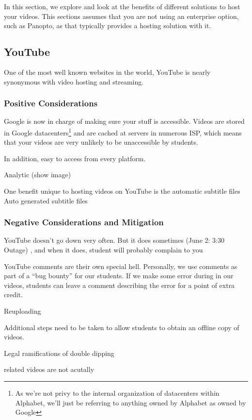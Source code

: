 \documentclass[sigconf]{acmart}
\begin{document}
In this section, we explore and look at the benefits of different solutions to host your videos.  
This sections assumes that you are not using an enterprise option, such as Panopto, as that typically provides a hosting solution with it.

\subsection{YouTube}
One of the most well known websites in the world, YouTube is nearly synonymous with video hosting and streaming.


\subsubsection{Positive Considerations}
Google is now in charge of making sure your stuff is accessible.
Videos are stored in Google datacenters\footnote{As we're not privy to the internal organization of datacenters within Alphabet, we'll just be referring to anything owned by Alphabet as owned by Google} and are cached at servers in numerous ISP, which means that your videos are very unlikely to be unaccessible by students. 

In addition, easy to access from every platform.

Analytic  (show image)


One benefit unique to hosting videos on YouTube is the automatic subtitle files \cite{liao2013large}
Auto generated subtitle files


\subsubsection{Negative Considerations and Mitigation}
YouTube doesn't go down very often.  
But it does sometimes \cite{outage2018} (June 2: 3:30 Outage) \cite{outage2019}, and when it does, student will probably complain to you 

YouTube comments are their own special hell.
Personally, we use comments as part of a ``bug bounty'' for our students.
If we make some error during in our videos, students can leave a comment describing the error for a point of extra credit.

Reuploading

Additional steps need to be taken to allow students to obtain an offline copy of videos.

Legal ramifications of double dipping

related videos are not acutally 
\end{document}
